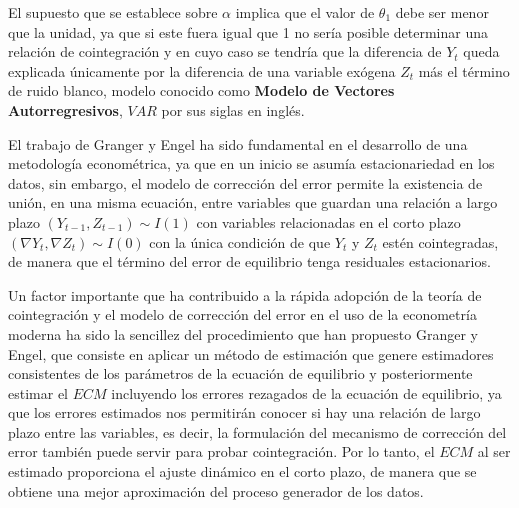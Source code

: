El supuesto que se establece sobre $\alpha$ implica que el valor de $\theta_1$ debe ser menor que la unidad, ya que si este fuera igual que 1 no sería posible determinar una   relación de cointegración   y en cuyo caso se tendría que la diferencia de $Y_t$ queda explicada únicamente por la diferencia de una  variable exógena $Z_t$ más el término de ruido blanco, modelo conocido como \textbf{Modelo de Vectores Autorregresivos}, $VAR$ por sus siglas en inglés. \bigskip


El trabajo de Granger y Engel ha sido fundamental en el desarrollo de una metodología econométrica, ya que en un inicio se asumía estacionariedad en los datos, sin embargo, el modelo de corrección del error permite la existencia de unión, en una misma ecuación,  entre variables que guardan una relación a largo plazo $(Y_{t-1},Z_{t-1}) \sim I(1)$ con variables relacionadas en el corto plazo $(\nabla Y_t, \nabla Z_t) \sim I(0)$ con la única condición de que $Y_t$ y $Z_t$ estén cointegradas, de manera que el término del error de equilibrio tenga residuales estacionarios. \bigskip

Un factor importante que ha contribuido a la rápida adopción de la teoría de cointegración y el modelo de corrección del error en el uso de la econometría moderna ha sido la sencillez del procedimiento que han propuesto Granger y Engel, que consiste en aplicar un método de estimación que genere estimadores consistentes de los parámetros de la ecuación de equilibrio y posteriormente estimar el $ECM$ incluyendo los errores rezagados de la ecuación de equilibrio, ya que los errores estimados nos permitirán conocer si hay una relación de largo plazo entre las variables, es decir, la formulación del mecanismo de corrección del error también puede servir para probar cointegración. Por lo tanto, el $ECM$ al ser estimado proporciona el ajuste dinámico en el corto plazo, de manera que se obtiene una mejor aproximación del proceso generador de los datos.  
 
